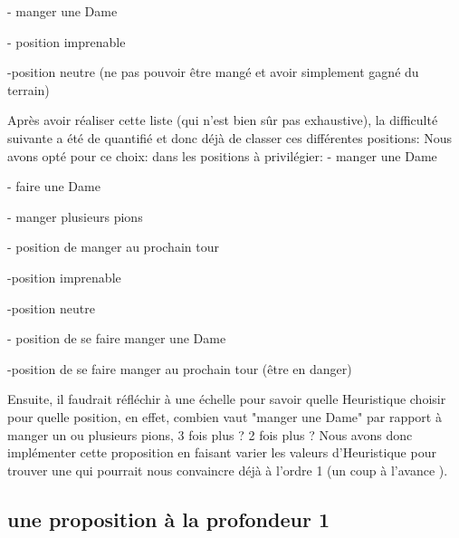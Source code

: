 \documentclass[12,french]{report}
\begin{document}
- manger une Dame

- position imprenable
 
 -position neutre (ne pas pouvoir être mangé et avoir simplement gagné du terrain)

Après avoir réaliser cette liste (qui n'est bien sûr pas exhaustive), la difficulté suivante a été de quantifié et donc déjà de classer ces différentes positions:
Nous avons opté pour ce choix:
dans les positions à privilégier:
- manger une Dame

- faire une Dame

- manger plusieurs pions

- position de manger au prochain tour

-position imprenable

-position neutre

- position de se faire manger une Dame

-position de se faire manger au prochain tour (être en danger)


Ensuite, il faudrait réfléchir à une échelle pour savoir quelle Heuristique choisir pour quelle position, en effet, combien vaut "manger une Dame" par rapport à manger un ou plusieurs pions, 3 fois plus ? 2 fois plus ?
Nous avons donc implémenter cette proposition en faisant varier les valeurs d'Heuristique pour trouver une qui pourrait nous convaincre déjà à l'ordre 1 (un coup à l'avance ).


\subsection{une proposition à la profondeur 1}

\end{document}
